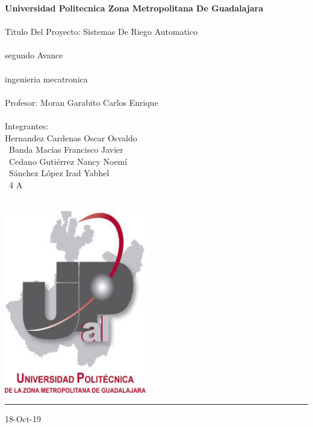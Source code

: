 \documentclass[a4paper,11pt,titlepage]{article}
\begin{document}
\begin{titlepage}
  \vspace*{1cm}
  {\fontsize{15}{34}\selectfont\bfseries Universidad Politecnica Zona Metropolitana De Guadalajara} \\\\
  {\large Titulo Del Proyecto: Sistemas De Riego Automatico }\\\\
  {\large segundo Avance} \\\\
  {\large ingenieria mecatronica} \\\\
  \large {Profesor: Moran Garabito Carlos Enrique} \\\\
  {\large Integrantes:} \\
  {\large Hernandez Cardenas Oscar Osvaldo} \\\
  {\large Banda Macías Francisco Javier} \\\
  {\large Cedano Gutiérrez Nancy Noemí} \\\
  {\large Sánchez López Irad Yabhel} \\\
  {\large 4 A} \\\
   
  \hfill
  \includegraphics[height=8cm]{upzmg.jpeg} \\
  {\color{gris}\hrule}
 
  \vfill
   {\hfill 18-Oct-19} \\
   

\end{titlepage}
\end{document}
